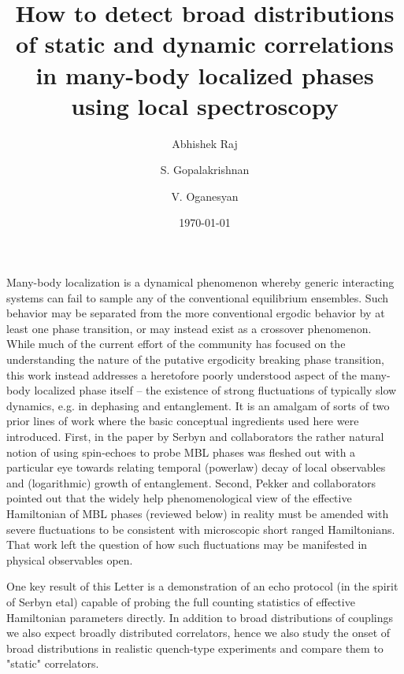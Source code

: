 \documentclass[aps,prb,twocolumn,showpacs,superscriptaddress,citeautoscript]{revtex4}  %
\begin{document}
\title{How to detect broad distributions of static and dynamic correlations in many-body localized phases using local spectroscopy}
\author{Abhishek Raj}
\author{S. Gopalakrishnan}
\author{V. Oganesyan}
\date{\today}
\begin{abstract}
\end{abstract}
%
\maketitle
Many-body localization is a dynamical phenomenon whereby generic interacting systems can fail to sample any of the conventional equilibrium ensembles. Such behavior may be separated from the more conventional ergodic behavior by at least one phase transition, or may instead exist as a crossover phenomenon.  While much of the current effort of the community has focused on the understanding the nature of the putative ergodicity breaking phase transition, this work instead addresses a heretofore poorly understood aspect of the many-body localized phase itself -- the existence of strong fluctuations of typically slow dynamics, e.g. in dephasing and entanglement. It is an amalgam of sorts of two prior lines of work where the basic conceptual ingredients used here were introduced. First, in the paper by Serbyn and collaborators the rather natural notion of using spin-echoes\cite{Serbyn} to probe MBL phases was fleshed out with a particular eye towards relating temporal (powerlaw) decay of local observables and (logarithmic) growth of entanglement. Second, Pekker and collaborators pointed out\cite{Pekker} that the widely help phenomenological view of the effective Hamiltonian of MBL phases (reviewed below) in reality must be amended with severe fluctuations to be consistent with microscopic short ranged Hamiltonians.  That work left the question of how such fluctuations may be manifested in physical observables open. 

One key result of this Letter is a demonstration of an echo protocol (in the spirit of Serbyn etal)  capable of probing the full counting statistics of effective Hamiltonian parameters directly.  In addition to broad distributions of couplings we also expect\cite{PalHuse} broadly distributed correlators, hence we also study the onset of broad distributions in realistic quench-type experiments and compare them to "static" correlators.
\end{document}
